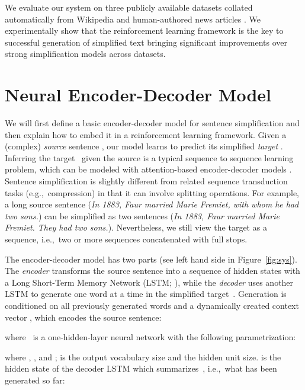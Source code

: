 \documentclass[11pt,letterpaper]{article}
\begin{document}
We evaluate our system on three publicly available datasets collated
automatically from Wikipedia
\cite{zhu2010monolingual,woodsend-lapata:2011:EMNLP} and
human-authored news articles \cite{Xu-EtAl:2015:TACL}. We
experimentally show that the reinforcement learning framework is the key
to successful generation of simplified text bringing significant
improvements over strong simplification models across datasets. 






\section{Neural Encoder-Decoder Model}
\label{sec:encdeca}

We will first define a basic encoder-decoder model for sentence
simplification and then explain how to embed it in a reinforcement
learning framework. Given a (complex) \emph{source} sentence
\mbox{}, our model learns to predict
its simplified \emph{target} .
Inferring the target~ given the source  is a typical sequence to
sequence learning problem, which can be modeled with attention-based
encoder-decoder models
\cite{bahdanau2014neural,luong-etal:2015:EMNLP}. Sentence
simplification is slightly different from related sequence
transduction tasks (e.g.,~compression) in that it can involve
splitting operations. For example, a long source sentence (\textsl{In
	1883, Faur married Marie Fremiet, with whom he had two sons.}) can
be simplified as two sentences (\textsl{In 1883, Faur married Marie
	Fremiet. They had two sons.}).  Nevertheless, we still view the
target as a sequence, i.e.,~two or more sequences concatenated with
full stops.

The encoder-decoder model has two parts (see left hand side in
Figure~\ref{fig:sys}). The \emph{encoder} transforms the source
sentence  into a sequence of hidden states
 with a
Long Short-Term Memory Network (LSTM; \citealt{hochreiter1997long}),
while the \emph{decoder} uses another LSTM to generate one word
 at a time in the simplified target~.
Generation is conditioned on all previously generated words
 and a dynamically created context vector ,
which encodes the source sentence:


where~ is a one-hidden-layer neural network with the
following parametrization:

where , , and ;  is the output vocabulary size and  the hidden unit
size.   is the hidden state of the decoder LSTM which
summarizes~, i.e.,~what has been generated so far:
\end{document}
